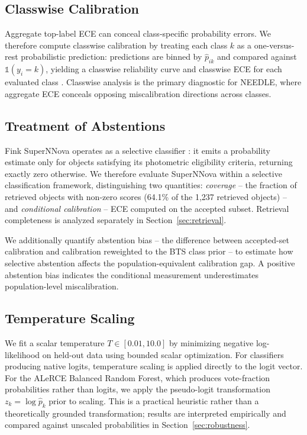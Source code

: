 \documentclass[a4paper,fleqn,usenatbib]{mnras}
\begin{document}
\subsection{Classwise Calibration}\label{sec:classwise_methods}

Aggregate top-label ECE can conceal class-specific probability
errors. We therefore compute classwise calibration by treating
each class $k$ as a one-versus-rest probabilistic prediction:
predictions are binned by $\hat{p}_{ik}$ and compared against
$\mathbb{1}(y_i = k)$, yielding a classwise reliability curve
and classwise ECE for each evaluated class \citep{nixon2019}.
Classwise analysis is the primary diagnostic for NEEDLE, where
aggregate ECE conceals opposing miscalibration directions across
classes.

\subsection{Treatment of Abstentions}\label{sec:abstentions}

Fink SuperNNova operates as a selective classifier
\citep{geifman2017}: it emits a probability estimate only for
objects satisfying its photometric eligibility criteria, returning
exactly zero otherwise. We therefore evaluate SuperNNova within
a selective classification framework, distinguishing two
quantities: \textit{coverage} -- the fraction of retrieved objects
with non-zero scores (64.1\% of the 1,237 retrieved objects) -- and
\textit{conditional calibration} -- ECE computed on the accepted
subset. Retrieval completeness is analyzed separately in
Section~\ref{sec:retrieval}.

We additionally quantify abstention bias -- the difference between
accepted-set calibration and calibration reweighted to the BTS
class prior -- to estimate how selective abstention affects the
population-equivalent calibration gap. A positive abstention bias
indicates the conditional measurement underestimates
population-level miscalibration.

\subsection{Temperature Scaling}\label{sec:tempscaling_methods}

We fit a scalar temperature $T \in [0.01, 10.0]$ by minimizing
negative log-likelihood on held-out data using bounded scalar
optimization. For classifiers producing native logits, temperature
scaling is applied directly to the logit vector. For the ALeRCE
Balanced Random Forest, which produces vote-fraction probabilities
rather than logits, we apply the pseudo-logit transformation
$z_k = \log \hat{p}_k$ prior to scaling. This is a practical
heuristic rather than a theoretically grounded transformation;
results are interpreted empirically and compared against unscaled
probabilities in Section~\ref{sec:robustness}.
\end{document}
